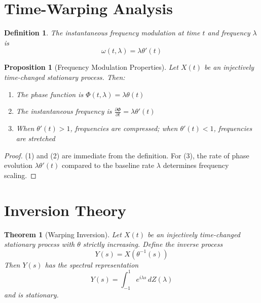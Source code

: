 \documentclass[11pt]{article}
\newtheorem{theorem}{Theorem}
\newtheorem{proposition}{Proposition}
\newtheorem{definition}{Definition}
\begin{document}
\section{Time-Warping Analysis}

\begin{definition}
The \emph{instantaneous frequency modulation} at time $t$ and frequency $\lambda$ is
\begin{equation}
\omega(t,\lambda) = \lambda\theta'(t)
\end{equation}
\end{definition}

\begin{proposition}[Frequency Modulation Properties]
Let $X(t)$ be an injectively time-changed stationary process. Then:
\begin{enumerate}
\item The phase function is $\Phi(t,\lambda) = \lambda\theta(t)$
\item The instantaneous frequency is $\frac{\partial\Phi}{\partial t} = \lambda\theta'(t)$
\item When $\theta'(t) > 1$, frequencies are compressed; when $\theta'(t) < 1$, frequencies are stretched
\end{enumerate}
\end{proposition}

\begin{proof}
(1) and (2) are immediate from the definition. For (3), the rate of phase evolution $\lambda\theta'(t)$ compared to the baseline rate $\lambda$ determines frequency scaling.
\end{proof}

\section{Inversion Theory}

\begin{theorem}[Warping Inversion]
Let $X(t)$ be an injectively time-changed stationary process with $\theta$ strictly increasing. Define the inverse process
\begin{equation}
Y(s) = X(\theta^{-1}(s))
\end{equation}
Then $Y(s)$ has the spectral representation
\begin{equation}
Y(s) = \int_{-1}^1 e^{i\lambda s} \, dZ(\lambda)
\end{equation}
and is stationary.
\end{theorem}
\end{document}
